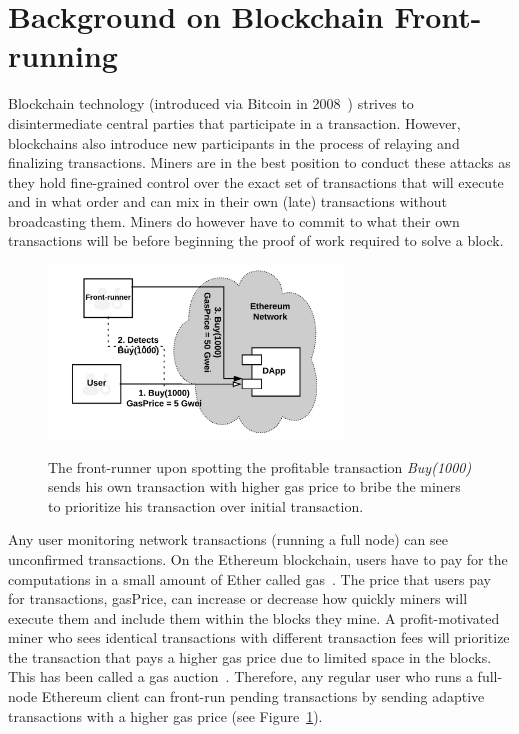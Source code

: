 \section{Background on Blockchain Front-running} \label{sec:Front Running on the Blockchains}

Blockchain technology (introduced via Bitcoin in 2008~\cite{nakamoto2008bitcoin}) strives to disintermediate central parties that participate in a transaction. However, blockchains also introduce new participants in the process of relaying and finalizing transactions. Miners are in the best position to conduct these attacks as they hold fine-grained control over the exact set of transactions that will execute and in what order and can mix in their own (late) transactions without broadcasting them. Miners do however have to commit to what their own transactions will be before beginning the proof of work required to solve a block.

\begin{figure}[h]
    \centering
    {\caption[Simple Front-running flow on a blockchain]{The front-runner upon spotting the profitable transaction \textit{Buy(1000)} sends his own transaction with higher gas price to bribe the miners to prioritize his transaction over initial transaction.}\label{fig:RegularFrontrunning}}
    {\includegraphics[width=0.7\textwidth]{figures/Regular_frontrunning.png}}
    \end{figure}

    
Any user monitoring network transactions (\eg running a full node) can see unconfirmed transactions. On the Ethereum blockchain, users have to pay for the computations in a small amount of Ether called \textsf{gas}~\cite{AccountT67:online}. The price that users pay for transactions, \textsf{gasPrice}, can increase or decrease how quickly miners will execute them and include them within the blocks they mine. A profit-motivated miner who sees identical transactions with different transaction fees will prioritize the transaction that pays a higher gas price due to limited space in the blocks. This has been called a gas auction~\cite{frontrunme}. Therefore, any regular user who runs a full-node Ethereum client can front-run pending transactions by sending adaptive transactions with a higher gas price (see Figure~\ref{fig:RegularFrontrunning}).

